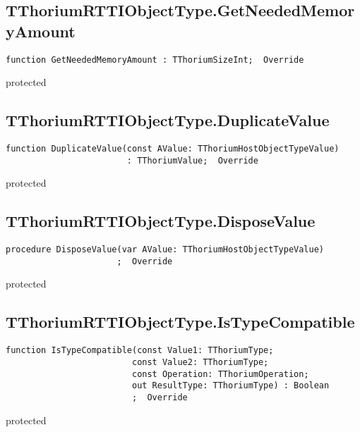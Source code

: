 \subsection{TThoriumRTTIObjectType.GetNeededMemoryAmount}
\label{thoriumcorepkg:thorium:tthoriumrttiobjecttype:getneededmemoryamount}
\begin{FPCList}
\Declaration 

\begin{verbatim}
function GetNeededMemoryAmount : TThoriumSizeInt;  Override
\end{verbatim}
\Visibility
protected
\end{FPCList}
\subsection{TThoriumRTTIObjectType.DuplicateValue}
\label{thoriumcorepkg:thorium:tthoriumrttiobjecttype:duplicatevalue}
\begin{FPCList}
\Declaration 

\begin{verbatim}
function DuplicateValue(const AValue: TThoriumHostObjectTypeValue)
                        : TThoriumValue;  Override
\end{verbatim}
\Visibility
protected
\end{FPCList}
\subsection{TThoriumRTTIObjectType.DisposeValue}
\label{thoriumcorepkg:thorium:tthoriumrttiobjecttype:disposevalue}
\begin{FPCList}
\Declaration 

\begin{verbatim}
procedure DisposeValue(var AValue: TThoriumHostObjectTypeValue)
                      ;  Override
\end{verbatim}
\Visibility
protected
\end{FPCList}
\subsection{TThoriumRTTIObjectType.IsTypeCompatible}
\label{thoriumcorepkg:thorium:tthoriumrttiobjecttype:istypecompatible}
\begin{FPCList}
\Declaration 

\begin{verbatim}
function IsTypeCompatible(const Value1: TThoriumType;
                         const Value2: TThoriumType;
                         const Operation: TThoriumOperation;
                         out ResultType: TThoriumType) : Boolean
                         ;  Override
\end{verbatim}
\Visibility
protected
\end{FPCList}
